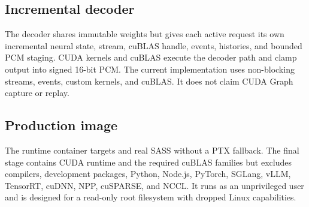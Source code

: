 \subsection{Incremental decoder}

The decoder shares immutable weights but gives each active request its own
incremental neural state, stream, cuBLAS handle, events, histories, and bounded
PCM staging. CUDA kernels and cuBLAS execute the decoder path and clamp output
into signed 16-bit PCM. The current implementation uses non-blocking streams,
events, custom kernels, and cuBLAS. It does not claim CUDA Graph capture or
replay.

\subsection{Production image}

The runtime container targets  and real  SASS
without a PTX fallback. The final stage contains CUDA runtime and the required
cuBLAS families but excludes compilers, development packages, Python, Node.js,
PyTorch, SGLang, vLLM, TensorRT, cuDNN, NPP, cuSPARSE, and NCCL. It runs as an
unprivileged user and is designed for a read-only root filesystem with dropped
Linux capabilities.
